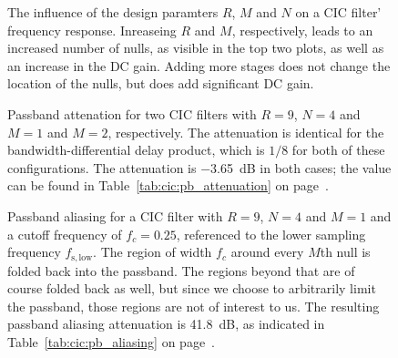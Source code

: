 \begin{figure}
    \centering
        
        \caption[Influence of Design Parameters on Frequency Response]{%
            The influence  of the design paramters  $R$, $M$ and $N$  on a CIC
            filter' frequency response.  Inreaseing $R$ and $M$, respectively,
            leads to an  increased number of nulls, as visible  in the top two
            plots,  as well  as  an  increase in  the  DC  gain.  Adding  more
            stages does  not change the  location of  the nulls, but  does add
            significant DC gain.%
        }
        \label{fig:cic:freq_responses:var}
\end{figure}

\begin{figure}
    \centering
        
        \caption[CIC Filter: Passband and Aliasing Attenuation]{%
            Passband   attenation   for   two    CIC   filters   with   $R=9$,
            $N=4$   and  $M=1$   and   $M=2$,  respectively. The   attenuation
            is  identical   for  the  bandwidth-differential   delay  product,
            which   is  $1/8$   for   both  of   these  configurations.    The
            attenuation   is  \SI{-3.65}{\dB}   in  both   cases;  the   value
            can    be   found    in   Table~\ref{tab:cic:pb_attenuation}    on
            page~\pageref{tab:cic:pb_attenuation}.%
        }
        \label{fig:cic:freq_responses:passband:attenuation}
\end{figure}

\begin{figure}
    \centering
        
        \caption[CIC Filter: Passband and Aliasing Attenuation]{%
            Passband aliasing for  a CIC filter with $R =  9$, $N=4$ and $M=1$
            and a  cutoff frequency of $f_c  = 0.25$, referenced to  the lower
            sampling frequency $f_\mathrm{s,low}$.  The  region of width $f_c$
            around  every $M$th  null is  folded back  into the  passband. The
            regions beyond that  are of course folded back as  well, but since
            we choose to arbitrarily limit the passband, those regions are not
            of interest to us.  The resulting passband aliasing attenuation is
            \SI{41.8}{\dB}, as indicated in Table~\ref{tab:cic:pb_aliasing} on
            page~\pageref{tab:cic:pb_aliasing}.%
        }
        \label{fig:cic:freq_responses:passband:aliasing}
\end{figure}
%
%
